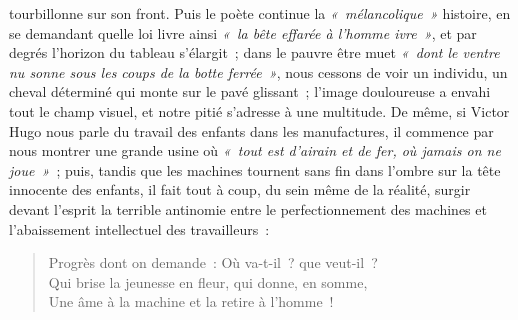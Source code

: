 \documentclass[french,twoside]{book} %
\begin{document}
tourbillonne sur son front. Puis le poète continue la \emph{« mélancolique »} histoire, en se demandant quelle loi livre ainsi \emph{« la bête effarée à l’homme ivre »}, et par degrés l’horizon du tableau s’élargit ; dans le pauvre être muet \emph{« dont le ventre nu sonne sous les coups de la botte ferrée »}, nous cessons de voir un individu, un cheval déterminé qui monte sur le pavé glissant ; l’image douloureuse a envahi tout le champ visuel, et notre pitié s’adresse à une multitude. De même, si Victor Hugo nous parle du travail des enfants dans les manufactures, il commence par nous montrer une grande usine où \emph{« tout est d’airain et de fer, où jamais on ne joue »} ; puis, tandis que les machines tournent sans fin dans l’ombre sur la tête innocente des  enfants, il fait tout à coup, du sein même de la réalité, surgir devant l’esprit la terrible antinomie entre le perfectionnement des machines et l’abaissement intellectuel des travailleurs :\par


\begin{verse}
Progrès dont on demande : Où va-t-il ? que veut-il ?\\
Qui brise la jeunesse en fleur, qui donne, en somme,\\
Une âme à la machine et la retire à l’homme !\\
\end{verse}
\end{document}
